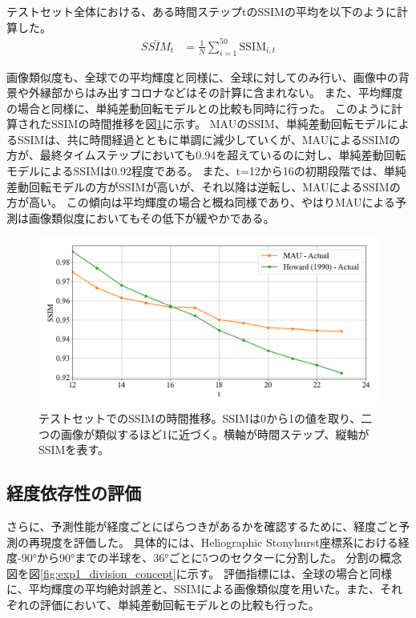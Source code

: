         テストセット全体における、ある時間ステップtのSSIMの平均を以下のように計算した。
        \begin{align}
          \bar{SSIM}_{t} & = \frac{1}{N} \sum_{i=1}^{50} \text{SSIM}_{i,t}
        \end{align}

        画像類似度も、全球での平均輝度と同様に、全球に対してのみ行い、画像中の背景や外縁部からはみ出すコロナなどはその計算に含まれない。
        また、平均輝度の場合と同様に、単純差動回転モデルとの比較も同時に行った。
        このように計算されたSSIMの時間推移を図\ref{fig:exp1_ssim_line}に示す。
        MAUのSSIM、単純差動回転モデルによるSSIMは、共に時間経過とともに単調に減少していくが、MAUによるSSIMの方が、最終タイムステップにおいても0.94を超えているのに対し、単純差動回転モデルによるSSIMは0.92程度である。
        また、t=12から16の初期段階では、単純差動回転モデルの方がSSIMが高いが、それ以降は逆転し、MAUによるSSIMの方が高い。
        この傾向は平均輝度の場合と概ね同様であり、やはりMAUによる予測は画像類似度においてもその低下が緩やかである。 
        
        \begin{figure}[htbp]
          \centering
          \includegraphics[width=\textwidth]{figures/exp1/average_ssim.png}
          \caption{テストセットでのSSIMの時間推移。SSIMは0から1の値を取り、二つの画像が類似するほど1に近づく。横軸が時間ステップ、縦軸がSSIMを表す。}
          \label{fig:exp1_ssim_line}
        \end{figure}
      

    \subsection{経度依存性の評価}
        さらに、予測性能が経度ごとにばらつきがあるかを確認するために、経度ごと予測の再現度を評価した。
        具体的には、Heliographic Stonyhurst座標系における経度-90°から90°までの半球を、36°ごとに5つのセクターに分割した。
        分割の概念図を図\ref{fig:exp1_division_concept}に示す。
        評価指標には、全球の場合と同様に、平均輝度の平均絶対誤差と、SSIMによる画像類似度を用いた。また、それぞれの評価において、単純差動回転モデルとの比較も行った。
        
